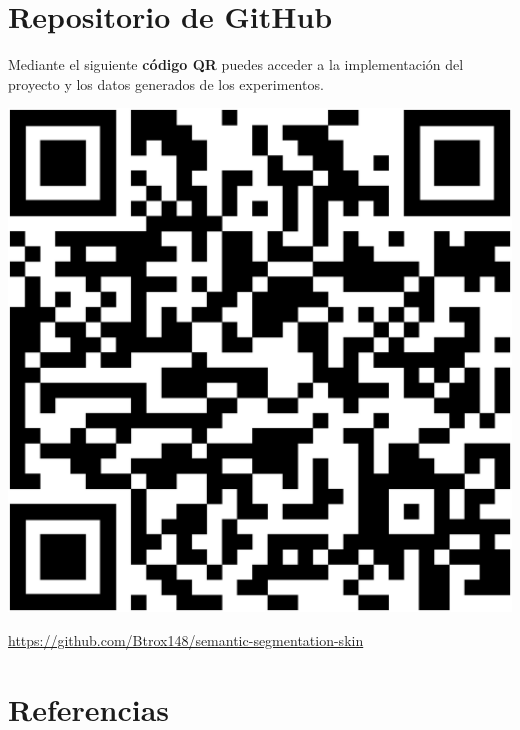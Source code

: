 \documentclass[a0,portrait]{a0poster}
\begin{document}
\begin{multicols}{3}
\section*{Repositorio de GitHub}
Mediante el siguiente \textbf{código QR} puedes acceder a la implementación del proyecto y los datos generados de los experimentos.
\begin{center}
    \includegraphics[scale=0.4]{repoqr.eps}
\end{center}
\small{
\url{https://github.com/Btrox148/semantic-segmentation-skin}
}

\section*{Referencias}

\small

\nocite{adam_opt}

\renewcommand\refname{\vskip -1cm}




\end{multicols}
\end{document}
